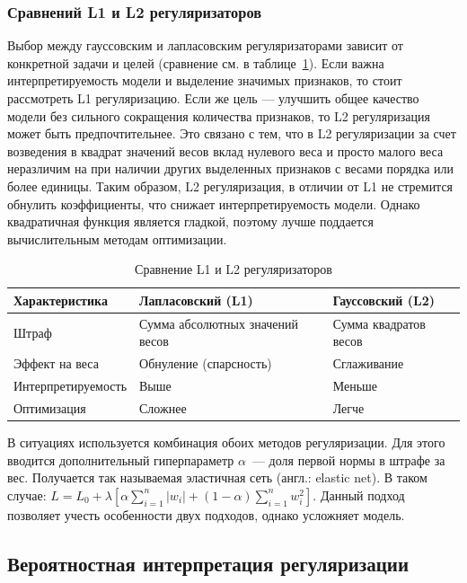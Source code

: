\subsubsection {Сравнений L1 и L2 регуляризаторов}

Выбор между гауссовским и лапласовским регуляризаторами зависит от конкретной задачи и целей (сравнение см. в таблице~\ref{linear-reg-comp}). Если важна интерпретируемость модели и выделение значимых признаков, то стоит рассмотреть L1 регуляризацию. Если же цель — улучшить общее качество модели без сильного сокращения количества признаков, то L2 регуляризация может быть предпочтительнее. Это связано с тем, что в L2 регуляризации за счет возведения в квадрат значений весов вклад нулевого веса и просто малого веса неразличим на при наличии других выделенных признаков с весами порядка или более единицы. Таким образом, L2 регуляризация, в отличии от L1 не стремится обнулить коэффициенты, что снижает интерпретируемость модели. Однако квадратичная функция является гладкой, поэтому лучше поддается вычислительным методам оптимизации.

\begin{table}[ht]
	\caption{Сравнение L1 и L2 регуляризаторов}
	\label{linear-reg-comp}
	\begin{tabular}{l|l|l}
		Характеристика & Лапласовский (L1) & Гауссовский (L2) \\
		\hline
		Штраф & Сумма абсолютных значений весов & Сумма квадратов весов \\
		Эффект на веса & Обнуление (спарсность) & Сглаживание \\
		Интерпретируемость & Выше & Меньше \\
		Оптимизация & Сложнее & Легче
	\end{tabular}
\end{table}

В ситуациях используется комбинация обоих методов регуляризации. Для этого вводится дополнительный гиперпараметр $\alpha$~--- доля первой нормы в штрафе за вес. Получается так называемая эластичная сеть (англ.: elastic net). В таком случае:
$L = L_0 + \lambda [\alpha \sum_{i=1}^{n} |w_i| + (1 - \alpha) \sum_{i=1}^{n} w_i^2]$. Данный подход позволяет учесть особенности двух подходов, однако усложняет модель.

\subsection {Вероятностная интерпретация регуляризации}
\label{linear-reg-prob}

